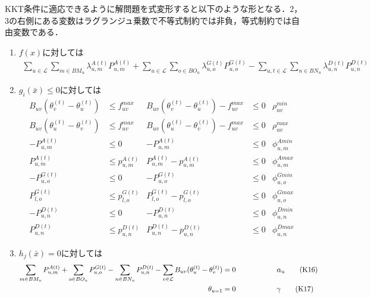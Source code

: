 \documentclass[a4j,10.5pt]{jarticle}
\begin{document}
KKT条件に適応できるように解問題を式変形すると以下のような形となる．2，3の右側にある変数はラグランジュ乗数で不等式制約では非負，等式制約では自由変数である．
\begin{enumerate}
\item $f(x)$に対しては
\begin{align}
\sum_{u\in \mathcal{L}}\sum_{m\in BM_u}\lambda^{A(t)}_{u,m}P^{A(t)}_{u,m}+\sum_{u\in \mathcal{L}}\sum_{o\in BO_u}\lambda^{G(t)}_{u,o}P^{G(t)}_{u,o}-\sum_{u,t\in \mathcal{L}}\sum_{n\in BN_u}\lambda^{D(t)}_{u,n}P^{D(t)}_{u,n}\label{K7}\tag{K7}
\end{align}
\item $g_i(\bar{x})\le 0$に対しては
\begin{align}
B_{uv}(\theta_v^{(t)}-\theta_u^{(t)})&\le f_{uv}^{max} &B_{uv}(\theta_v^{(t)}-\theta_u^{(t)})-f_{uv}^{max}&\le 0 &\rho_{uv}^{min}\label{K8}\tag{K8}\\
B_{uv}(\theta_u^{(t)}-\theta_v^{(t)})&\le f_{uv}^{max}&B_{uv}(\theta_u^{(t)}-\theta_v^{(t)})-f_{uv}^{max}&\le 0&\rho_{uv}^{max}\label{K9}\tag{K9}\\
-P_{u,m}^{A(t)}&\le 0&-P_{u,m}^{A(t)}&\le 0&\phi_{u,m}^{Amin}\label{K10}\tag{K10}\\
P_{u,m}^{A(t)}&\le p_{u,m}^{A(t)}&P_{u,m}^{A(t)}-p_{u,m}^{A(t)}&\le 0&\phi_{u,m}^{Amax}\label{K11}\tag{K11}\\
-P_{u,o}^{G(t)}&\le 0&-P_{u,o}^{G(t)}&\le 0&\phi_{u,o}^{Gmin}\label{K12}\tag{K12}\\
P_{l,o}^{G(t)}&\le p_{l,o}^{G(t)}&P_{l,o}^{G(t)}-p_{l,o}^{G(t)}&\le 0&\phi_{u,o}^{Gmax}\label{K13}\tag{K13}\\
-P_{u,n}^{D(t)}&\le 0&-P_{u,n}^{D(t)}&\le 0&\phi_{u,n}^{Dmin}\label{K14}\tag{K14}\\
P_{u,n}^{D(t)}&\le p_{u,n}^{D(t)}&P_{u,n}^{D(t)}-p_{u,n}^{D(t)}&\le 0&\phi_{u,n}^{Dmax}\label{K15}\tag{K15}
\end{align}
\item $h_j(\bar{x})=0$に対しては
\begin{align}
\sum_{m\in BM_u}P^{A(t)}_{u,m}+\sum_{o\in BO_u}P^{G(t)}_{u,o}-\sum_{n\in BN_u}P^{D(t)}_{u,n}-\sum_{v\in \mathcal{L}}B_{uv}(\theta_u^{(t)}-\theta_v^{(t)})=0&\hspace{20mm}\alpha_u\label{K16}\tag{K16}\\
\theta_{u=1}=0&\hspace{20mm}\gamma\label{K17}\tag{K17}
\end{align}
\end{enumerate}
\newpage
\end{document}
